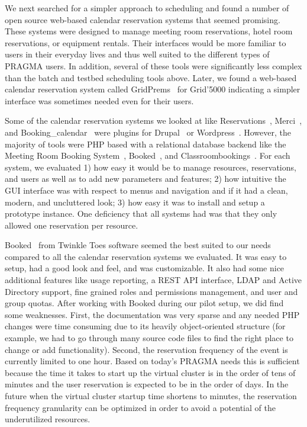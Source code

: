 \documentclass[times]{cpeauth}
\begin{document}
We next searched for a simpler approach to scheduling and found a number of open source web-based calendar reservation systems that seemed promising.  These systems were designed to manage meeting room reservations, hotel room reservations, or equipment rentals.   Their interfaces would be more familiar to users in their everyday lives and thus well suited to the different types of PRAGMA users.  In addition, several of these tools were significantly less complex than the batch and testbed scheduling tools above.  Later, we found a web-based calendar reservation system called GridPrems~\cite{gridprems} for Grid'5000 indicating a simpler interface was sometimes needed even for their users.

Some of the calendar reservation systems we looked at like Reservations~\cite{drupalreservations}, Merci~\cite{merci}, and Booking\_calendar~\cite{wordpressbooking} were plugins for Drupal~\cite{drupal} or Wordpress~\cite{wordpress}.  However, the majority of tools were PHP based with a relational database backend like the Meeting Room Booking System~\cite{mrbs}, Booked~\cite{booked}, and Classroombookings~\cite{classroombookings}.  For each system, we evaluated 1) how easy it would be to manage resources, reservations, and users as well as to add new parameters and features; 2) how intuitive the GUI interface was with respect to menus and navigation and if it had a clean, modern, and uncluttered look; 3)  how easy it was to install and setup a prototype instance. One deficiency that all systems had was that they only allowed one reservation per resource.

Booked~\cite{booked} from Twinkle Toes software seemed the best suited to our needs compared to all the calendar reservation systems we evaluated.  It was easy to setup, had  a good look and feel, and was customizable.  It also had some nice additional features like usage reporting, a REST API interface, LDAP and Active Directory support, fine grained roles and permissions management, and user and group quotas.  After working with Booked during our pilot setup, we did find some weaknesses.  First, the documentation was very sparse and any needed PHP changes were time consuming due to its heavily object-oriented structure (for example, we had to go through many source code files to find the right place to change  or add functionality).   Second, the reservation frequency of the event is currently limited to one hour.  Based on today's PRAGMA needs this is sufficient because the time it takes to start up the virtual cluster 
is in the order of tens of minutes and  the user reservation is expected to be in the order of days. In the future when the virtual cluster startup  time shortens to minutes, the reservation frequency granularity can be optimized in order to avoid a potential of the underutilized resources.
\end{document}

